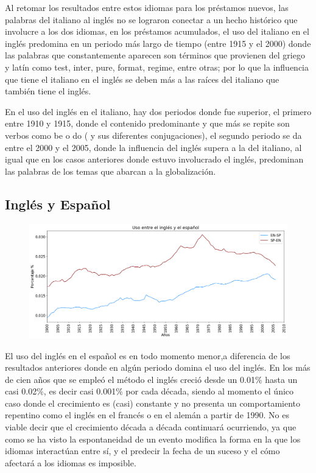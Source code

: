 Al retomar los resultados entre estos idiomas para los préstamos nuevos, las palabras del italiano al inglés no se lograron conectar a un hecho histórico que involucre a los dos idiomas, en los préstamos acumulados, el uso del italiano en el inglés predomina en un periodo más largo de tiempo (entre 1915 y el 2000) donde las palabras que constantemente aparecen son términos que provienen del griego y latín como test, inter, pure, format, regime, entre otras;  por lo que la influencia que tiene el italiano en el inglés se deben más a las raíces del italiano que también tiene el inglés.  

En el uso del inglés en el italiano,  hay dos periodos donde fue superior, el primero entre 1910 y 1915, donde el contenido predominante y que más se repite son verbos como be o do ( y sus diferentes conjugaciones),  el segundo periodo se da entre el 2000 y el 2005, donde la influencia del inglés supera a la del italiano, al igual que en los casos anteriores donde estuvo involucrado el inglés, predominan las palabras de los temas que abarcan a la globalización. 


\newpage
\subsection{Inglés y Español}

\begin{figure}[h!]
	\centering
	\includegraphics[scale=.38]{Cap_4/SF_4_S2_EN.png}
	\label{SF_ES}
	\caption{}
\end{figure}

El uso del inglés en el español es en todo momento menor,a diferencia de los resultados anteriores donde en algún periodo domina el uso del inglés.  En los más de cien años que se empleó el método el inglés creció desde un 0.01$\%$ hasta un casi 0.02$\%$, es decir casi 0.001$\%$ por cada década, siendo al momento el único caso donde el crecimiento es (casi) constante y no presenta un comportamiento repentino como el inglés en el francés o en el alemán a partir de 1990. No es viable decir que el crecimiento década a década continuará ocurriendo, ya que como se ha visto la espontaneidad de un evento modifica la forma en la que los idiomas interactúan entre sí, y el predecir la fecha de un suceso y el cómo afectará a los idiomas es imposible.  

